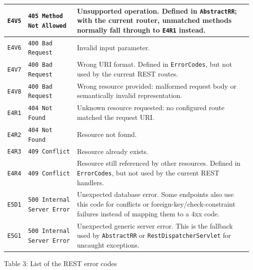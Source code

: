 \begin{longtable}{|>{\raggedright\arraybackslash}p{}|>{\raggedright\arraybackslash}p{}|>{\raggedright\arraybackslash}p{}|}
\hline
\texttt{E4V5} & \texttt{405 Method} \texttt{Not Allowed} & Unsupported operation. Defined in \texttt{AbstractRR}; with the current router, unmatched methods normally fall through to \texttt{E4R1} instead. \\
\hline
\texttt{E4V6} & \texttt{400 Bad Request} & Invalid input parameter. \\
\hline
\texttt{E4V7} & \texttt{400 Bad Request} & Wrong URI format. Defined in \texttt{ErrorCodes}, but not used by the current REST routes. \\
\hline
\texttt{E4V8} & \texttt{400 Bad Request} & Wrong resource provided: malformed request body or semantically invalid representation. \\
\hline
\texttt{E4R1} & \texttt{404 Not Found} & Unknown resource requested: no configured route matched the request URI. \\
\hline
\texttt{E4R2} & \texttt{404 Not Found} & Resource not found. \\
\hline
\texttt{E4R3} & \texttt{409 Conflict} & Resource already exists. \\
\hline
\texttt{E4R4} & \texttt{409 Conflict} & Resource still referenced by other resources. Defined in \texttt{ErrorCodes}, but not used by the current REST handlers. \\
\hline
\texttt{E5D1} & \texttt{500 Internal} \texttt{Server Error} & Unexpected database error. Some endpoints also use this code for conflicts or foreign-key/check-constraint failures instead of mapping them to a 4xx code. \\
\hline
\texttt{E5G1} & \texttt{500 Internal} \texttt{Server Error} & Unexpected generic server error. This is the fallback used by \texttt{AbstractRR} or \texttt{RestDispatcherServlet} for uncaught exceptions. \\
\hline
\end{longtable}
\normalsize

\begin{center}
Table 3: List of the REST error codes
\end{center}
